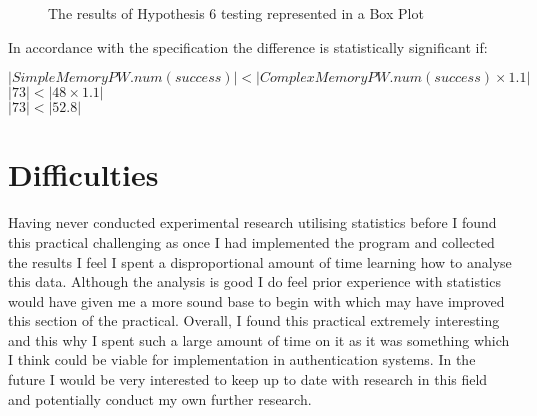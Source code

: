 \documentclass{article}
\begin{document}
\begin{figure} [H]
    \centering
    \caption{The results of Hypothesis 6 testing represented in a Box Plot}
    \label{fig:boxPlotHyp6}
\end{figure}

In accordance with the specification the difference is statistically significant if: 
\begin{center}
    $ |SimpleMemoryPW.num(success)| < |ComplexMemoryPW.num(success) \times 1.1|$ \\
    $ |73| < |48 \times 1.1| $ \\
    $ |73| < |52.8| $
\end{center}

\section{Difficulties}
Having never conducted experimental research utilising statistics before I found this practical challenging as once I had implemented the program and collected the results I feel I spent a disproportional amount of time learning how to analyse this data. Although the analysis is good I do feel prior experience with statistics would have given me a more sound base to begin with which may have improved this section of the practical. Overall, I found this practical extremely interesting and this why I spent such a large amount of time on it as it was something which I think could be viable for implementation in authentication systems. In the future I would be very interested to keep up to date with research in this field and potentially conduct my own further research. 
\end{document}
